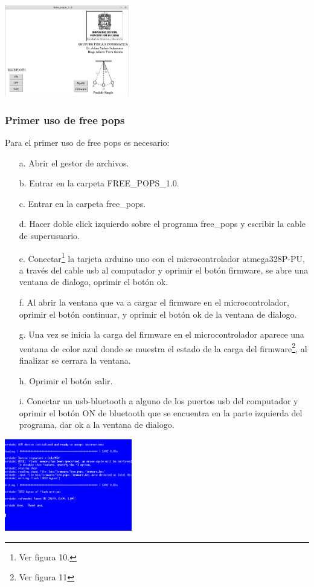 \documentclass[12pt]{article}
\newenvironment{Figure}
{\par\medskip\noindent\minipage{\linewidth}}
{\endminipage\par\medskip}
\begin{document}
\begin{multicols}{2}
\begin{Figure}
\center
\includegraphics[width=8.cm, height=4cm]{fig/Docu1.png}
\label{fig:g10}
\end{Figure}

\subsubsection{Primer uso de free pops}
Para el primer uso de free pops es necesario:
\begin{enumerate}
\item[a. ] Abrir el gestor de archivos.
\item[b. ] Entrar en la carpeta FREE\_POPS\_1.0.
\item[c. ] Entrar en la carpeta free\_pops.
\item[d. ] Hacer doble click izquierdo sobre el programa free\_pops y escribir la cable de superusuario.
\item[e. ] Conectar\footnote{ Ver figura 10.} la tarjeta arduino uno con el microcontrolador atmega328P-PU, a través del cable usb al computador y oprimir el botón firmware, se abre una ventana de dialogo, oprimir el botón ok. 
\item[f. ] Al abrir la ventana que va a cargar el firmware en el microcontrolador, oprimir el botón continuar, y oprimir el botón ok de la  ventana de dialogo.
\item[g. ] Una vez se inicia la carga del firmware en el microcontrolador aparece una ventana de color azul donde se muestra el estado de la carga del firmware\footnote{ Ver figura 11}, al finalizar se cerrara la ventana.
\item[h. ] Oprimir el botón salir.
\item[i. ] Conectar un usb-bluetooth a alguno de los puertos usb del computador y oprimir el botón ON de bluetooth que se encuentra en la parte izquierda del programa, dar ok a la ventana de dialogo.
\end{enumerate}

\begin{Figure}
\center
\includegraphics[width=8.cm, height=4cm]{fig/micro.png}
\label{fig:g11}
\end{Figure}
  

\end{multicols}
\end{document}

